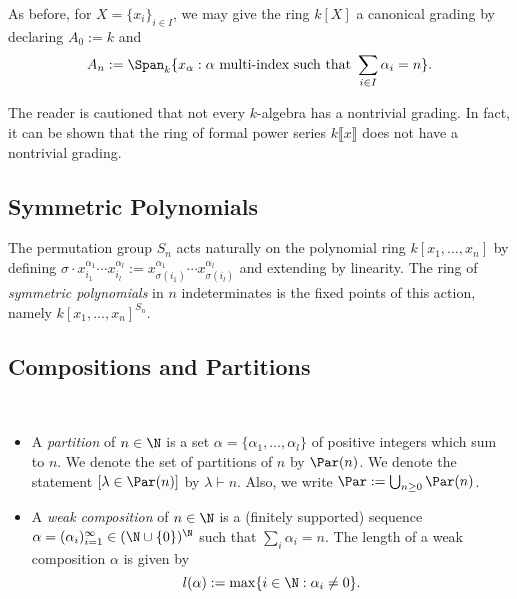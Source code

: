 \documentclass[12pt]{article}
\begin{document}

\begin{keyexample*}
  As before, for $ X = \{x_{i}\}_{i\in I} $, we may give the ring $ k[X] $ a canonical grading by declaring $ A_{0}:=k $ and
  \[
    A_{n} := \Span_{k}\{x_{\alpha}: \alpha \text{ multi-index such that } \sum_{i\in I} \alpha_{i} = n\}.
  \]
\end{keyexample*} 
The reader is cautioned that not every $ k $-algebra has a nontrivial grading. In fact, it can be shown that the ring of formal power series $ k\llbracket x \rrbracket $ does not have a nontrivial grading.



\subsection{Symmetric Polynomials}

\begin{definition}\label{def:sympoly}
  The permutation group $ S_{n} $ acts naturally on the polynomial ring $ k[x_{1},\ldots,x_{n}] $ by defining $ \sigma \cdot x_{i_{1}}^{\alpha_1}\cdots x_{i_l}^{\alpha_{l}} := x_{\sigma(i_{1})}^{\alpha_{1}}\cdots x_{\sigma(i_{l})}^{\alpha_{l}}$ and extending by linearity. The ring of \textit{symmetric polynomials} in $ n $ indeterminates is the fixed points of this action, namely $ k[x_{1},\ldots, x_{n}]^{S_{n}} $.
\end{definition}

\subsection{Compositions and Partitions}
\begin{definition}\label{def:comp}\ 
  \begin{itemize}
    \item A \textit{partition} of $ n\in \N $ is a set $ \alpha=\{\alpha_{1},\ldots, \alpha_{l}\} $ of positive integers which sum to $ n $. We denote the set of partitions of $ n $ by $ \Par(n) $. We denote the statement $ [\lambda\in \Par(n)] $ by $ \lambda\vdash n $. Also, we write $ \Par:=\bigcup_{n\geq0}\Par(n) $.
    \item A \textit{weak composition} of $ n\in \N $ is a (finitely supported) sequence $\alpha=(\alpha_{i})_{i=1}^{\infty}\in (\N\cup\{0\})^{\N}$ such that $ \sum_{i} \alpha_{i} = n $. The length of a weak composition $ \alpha $ is given by
  \[
    l(\alpha) :=\max\{i\in \N: \alpha_{i}\neq 0\}.
  \]
  \end{itemize}

  
\end{definition}
\end{document}
